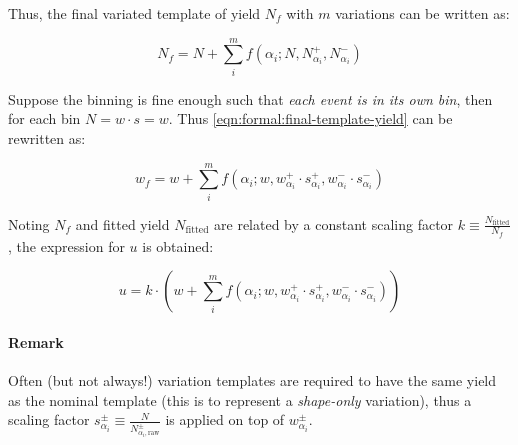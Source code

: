 Thus, the final variated template of yield $N_f$ with $m$ variations can be
written as:

\begin{equation}
    N_f = N + \sum_i^m f(\alpha_i; N, N_{\alpha_i}^+, N_{\alpha_i}^-)
    \label{eqn:formal:final-template-yield}
\end{equation}

Suppose the binning is fine enough such that \emph{each event is in its own bin},
then for each bin $N = w \cdot s = w$.
Thus \cref{eqn:formal:final-template-yield} can be rewritten as:

\begin{equation}
    w_f = w + \sum_i^m
    f(\alpha_i;
      w,
      w_{\alpha_i}^+ \cdot s_{\alpha_i}^+,
      w_{\alpha_i}^- \cdot s_{\alpha_i}^-
     )
\end{equation}

Noting $N_f$ and fitted yield $N_\text{fitted}$ are related by a constant
scaling factor $k \equiv \frac{N_\text{fitted}}{N_f}$, the expression for $u$ is
obtained:

\begin{equation}
    u = k \cdot \left( w + \sum_i^m
    f(\alpha_i;
      w,
      w_{\alpha_i}^+ \cdot s_{\alpha_i}^+,
      w_{\alpha_i}^- \cdot s_{\alpha_i}^-
     )\right)
\end{equation}

\paragraph{Remark} Often (but not always!) variation templates are required to
have the same yield as the nominal template (this is to represent a
\emph{shape-only} variation), thus a scaling factor
$s_{\alpha_i}^\pm \equiv \frac{N}{N_{\alpha_i,\text{raw}}^\pm}$
is applied on top of $w_{\alpha_i}^\pm$.
